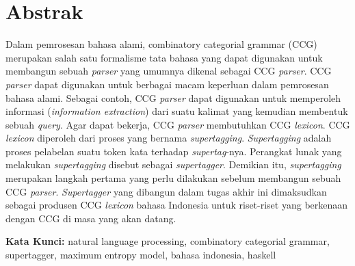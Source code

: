 \chapter*{Abstrak}

Dalam pemrosesan bahasa alami, combinatory categorial grammar (CCG) merupakan salah satu
formalisme tata bahasa yang dapat digunakan untuk membangun sebuah \textit{parser} yang umumnya
dikenal sebagai CCG \textit{parser}.
CCG \textit{parser} dapat digunakan untuk berbagai macam keperluan dalam pemrosesan bahasa alami.
Sebagai contoh, CCG \textit{parser} dapat digunakan untuk memperoleh informasi
(\textit{information extraction}) dari suatu kalimat yang kemudian membentuk sebuah \textit{query}.
Agar dapat bekerja, CCG \textit{parser} membutuhkan CCG \textit{lexicon}.
CCG \textit{lexicon} diperoleh dari proses yang bernama \textit{supertagging}.
\textit{Supertagging} adalah proses pelabelan suatu token kata terhadap \textit{supertag}-nya.
Perangkat lunak yang melakukan \textit{supertagging} disebut sebagai \textit{supertagger}.
Demikian itu, \textit{supertagging} merupakan langkah pertama yang perlu dilakukan sebelum
membangun sebuah CCG \textit{parser}.
\textit{Supertagger} yang dibangun dalam tugas akhir ini dimaksudkan sebagai produsen CCG
\textit{lexicon} bahasa Indonesia untuk riset-riset yang berkenaan dengan CCG di masa yang akan datang.


\vspace{0.5 cm}
\begin{flushleft}
{\textbf{Kata Kunci:}
  natural language processing, combinatory categorial grammar, supertagger,
  maximum entropy model, bahasa indonesia, haskell
}
\end{flushleft}

